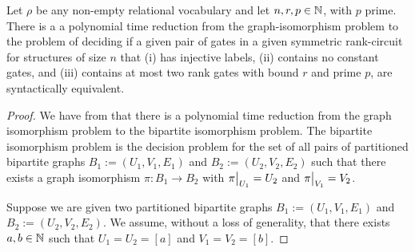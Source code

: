 \documentclass[../paper.tex]{subfiles}
\begin{document}
\begin{prop}
  Let $\rho$ be any non-empty relational vocabulary and let $n, r, p \in \mathbb{N}$,
  with $p$ prime. There is a a polynomial time reduction from the
  graph-isomorphism problem to the problem of deciding if a given pair of gates
  in a given symmetric rank-circuit for structures of size $n$ that (i) has
  injective labels, (ii) contains no constant gates, and (iii) contains at most
  two rank gates with bound $r$ and prime $p$, are syntactically equivalent.
  \label{prop:syntactic-graph-iso}
\end{prop}
\begin{proof}
  We have from \cite{} that there is a polynomial time reduction from the graph
  isomorphism problem to the bipartite isomorphism problem. The bipartite
  isomorphism problem is the decision problem for the set of all pairs of
  partitioned bipartite graphs $B_1 := (U_1, V_1, E_1)$ and $B_2 := (U_2, V_2,
  E_2)$ such that there exists a graph isomorphism $\pi : B_1 \rightarrow B_2$
  with $\restr{\pi}{U_1} = U_2$ and $\restr{\pi}{V_1} = V_2$.

  Suppose we are given two partitioned bipartite graphs $B_1 := (U_1, V_1, E_1)$
  and $B_2 := (U_2, V_2, E_2)$. We assume, without a loss of generality, that
  there exists $a, b \in \mathbb{N}$ such that $U_1 = U_2 = [a]$ and $V_1 = V_2 =
  [b]$.


\end{proof}
\end{document}
